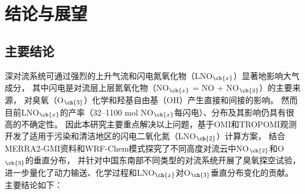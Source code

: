 
\chapter{结论与展望}

\section{主要结论}

深对流系统可通过强烈的上升气流和闪电氮氧化物（LNO$_{\ch{x}}$）显著地影响大气成分，
其中闪电是对流层上层氮氧化物（NO$_{\ch{x}}$ = NO + NO$_{\ch{2}}$）的主要来源，
对臭氧（O$_{\ch{3}}$）化学和羟基自由基（OH）产生直接和间接的影响。
然而目前LNO$_{\ch{x}}$的产率（32--1100 mol NO$_{\ch{x}}$每闪电）、分布及其影响仍具有很高的不确定性。
因此本研究主要重点解决以上问题，基于OMI和TROPOMI观测开发了适用于污染和清洁地区的闪电二氧化氮（LNO$_{\ch{2}}$）计算方案，
结合MERRA2-GMI资料和WRF-Chem模式探究了不同高度对流云中NO$_{\ch{2}}$和O$_{\ch{3}}$的垂直分布，
并针对中国东南部不同类型的对流系统开展了臭氧探空试验，
进一步量化了动力输送、化学过程和LNO$_{\ch{x}}$对O$_{\ch{3}}$垂直分布变化的贡献。
主要结论如下：

